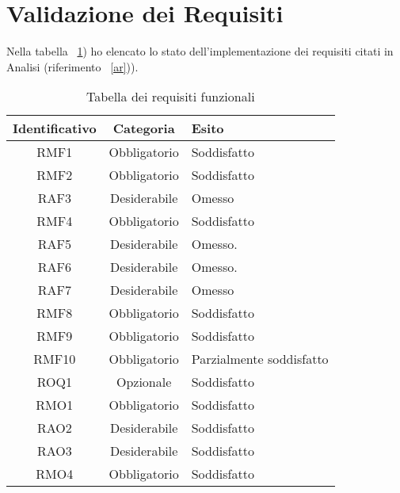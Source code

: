 \section{Validazione dei Requisiti}

Nella tabella ~\ref{tab:validazione-requisiti}) ho elencato lo stato dell'implementazione dei requisiti citati in Analisi (riferimento ~\ref{ar})).

\begin{table}[H]
\caption{Tabella dei requisiti funzionali}
\label{tab:validazione-requisiti}
\begin{tabularx}{\linewidth}{|c|c|X|}
\hline
\textbf{Identificativo} & \textbf{Categoria} & \textbf{Esito} \\
\hline
RMF1 & Obbligatorio & Soddisfatto \\
\hline
RMF2 & Obbligatorio & Soddisfatto \\
\hline
RAF3 & Desiderabile & Omesso \\
\hline
RMF4 & Obbligatorio & Soddisfatto \\
\hline
RAF5 & Desiderabile & Omesso. \\
\hline
RAF6 & Desiderabile & Omesso. \\
\hline
RAF7 & Desiderabile & Omesso \\
\hline
RMF8 & Obbligatorio & Soddisfatto \\
\hline
RMF9 & Obbligatorio & Soddisfatto \\
\hline
RMF10 & Obbligatorio & Parzialmente soddisfatto \\
\hline
ROQ1 & Opzionale & Soddisfatto \\
\hline
RMO1 & Obbligatorio & Soddisfatto \\
\hline
RAO2 & Desiderabile & Soddisfatto \\
\hline
RAO3 & Desiderabile & Soddisfatto \\
\hline
RMO4 & Obbligatorio & Soddisfatto \\
\hline
\end{tabularx}
\end{table}


